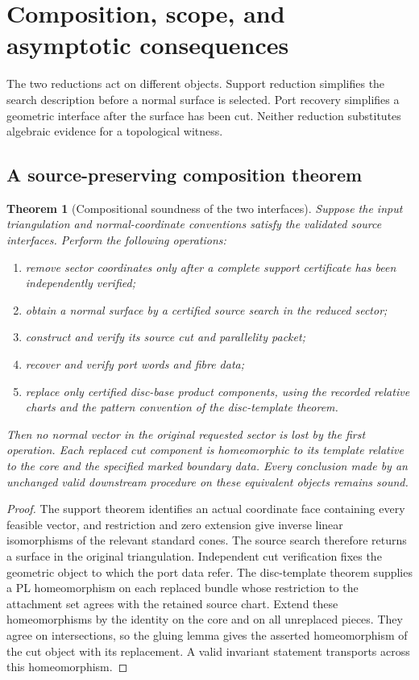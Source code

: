 \documentclass[11pt]{article}
\newtheorem{theorem}{Theorem}[section]
\theoremstyle{definition}
\theoremstyle{remark}
\begin{document}


\section{Composition, scope, and asymptotic consequences}
\label{sec:composition}

The two reductions act on different objects. Support reduction simplifies
the search description before a normal surface is selected. Port recovery
simplifies a geometric interface after the surface has been cut.
Neither reduction substitutes algebraic evidence for a topological
witness.

\subsection{A source-preserving composition theorem}

\begin{theorem}[Compositional soundness of the two interfaces]
Suppose the input triangulation and normal-coordinate conventions satisfy
the validated source interfaces. Perform the following operations:
\begin{enumerate}
\item remove sector coordinates only after a complete support certificate
has been independently verified;
\item obtain a normal surface by a certified source search in the reduced
sector;
\item construct and verify its source cut and parallelity packet;
\item recover and verify port words and fibre data;
\item replace only certified disc-base product components, using the
recorded relative charts and the pattern convention of the disc-template
theorem.
\end{enumerate}
Then no normal vector in the original requested sector is lost by the
first operation. Each replaced cut component is homeomorphic to its
template relative to the core and the specified marked boundary data.
Every conclusion made by an unchanged valid downstream procedure on these
equivalent objects remains sound.
\end{theorem}
\begin{proof}
The support theorem identifies an actual coordinate face containing every
feasible vector, and restriction and zero extension give inverse linear
isomorphisms of the relevant standard cones. The source search therefore
returns a surface in the original triangulation. Independent cut
verification fixes the geometric object to which the port data refer.
The disc-template theorem supplies a PL homeomorphism on each replaced
bundle whose restriction to the attachment set agrees with the retained
source chart. Extend these homeomorphisms by the identity on the core and
on all unreplaced pieces. They agree on intersections, so the gluing lemma
gives the asserted homeomorphism of the cut object with its replacement.
A valid invariant statement transports across this homeomorphism.
\end{proof}
\end{document}
